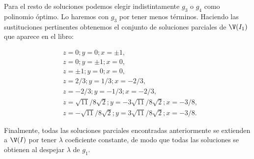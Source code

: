 \documentclass[twoside]{article}
\begin{document}
\begin{solucion}
Para el resto de soluciones podemos elegir indistintamente $g_3$ o $g_4$ como polinomio óptimo. Lo haremos con $g_3$ por tener menos términos. Haciendo las sustituciones pertinentes obtenemos el conjunto de soluciones parciales de $\V(I_1)$ que aparece en el libro:

\begin{align*}
&z = 0; y = 0; x = ±1,\\
&z = 0; y = ±1; x = 0,\\
&z = ±1; y = 0; x = 0,\\
&z = 2/3; y = 1/3; x = −2/3,\\
&z = −2/3; y = −1/3; x = −2/3,\\
&z =\sqrt{11}/8\sqrt{2}; y = −3\sqrt{11}/8\sqrt{2}; x = −3/8,\\
&z = −\sqrt{11}/8\sqrt{2}; y = 3\sqrt{11}/8\sqrt{2}; x = −3/8.
\end{align*}

Finalmente, todas las soluciones parciales encontradas anteriormente se extienden a $\V(I)$ por tener $\lambda$ coeficiente constante, de modo que todas las soluciones se obtienen al despejar $\lambda$ de $g_1$. 
\end{solucion}
\end{document}
